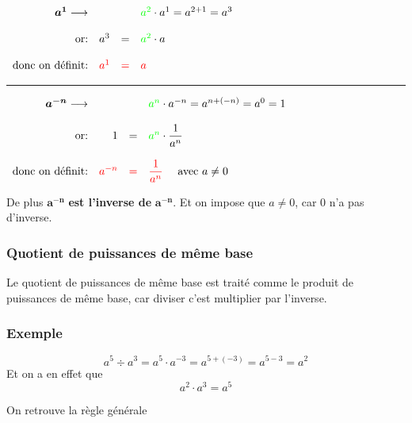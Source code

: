 \documentclass[
  12pt,
]{book}
\begin{document}
\(\begin{array}{rrcl}  \boldsymbol{a^1}\longrightarrow & & & {\color{green}a^2}\cdot a^1 = a^{2+1} = a^3\\  &&&\\  \text{or:}& a^3 & = & {\color{green}a^2}\cdot a\\  &&&\\  \text{donc on définit:}&{\color{red}a^1} & {\color{red}=} & {\color{red}a}\\  \end{array}\)

\begin{center}\rule{0.5\linewidth}{0.5pt}\end{center}

\(\begin{array}{rrcl}  \boldsymbol{a^{-n}}\longrightarrow & & & {\color{green}a^n}\cdot a^{-n} = a^{n+(-n)} = a^0 = 1\\  &&&\\  \text{or:}& 1 & = & {\color{green}a^n}\cdot \dfrac{1}{a^{n}}\\  &&&\\  \text{donc on définit:}&{\color{red}a^{-n}} & {\color{red}=} & {\color{red}\dfrac{1}{a^n}}\quad\text{ avec } a\neq 0\\  \end{array}\)

De plus \(\boldsymbol{a^{-n}}\) \textbf{est l'inverse de} \(\boldsymbol{a^{-n}}\). Et on impose que \(a\neq 0\), car \(0\) n'a pas d'inverse.

\hypertarget{quotient-de-puissances-de-muxeame-base}{%
\subsubsection{Quotient de puissances de même base}\label{quotient-de-puissances-de-muxeame-base}}

Le quotient de puissances de même base est traité comme le produit de puissances de même base, car diviser c'est multiplier par l'inverse.

\hypertarget{exemple}{%
\subsubsection{Exemple}\label{exemple}}

\[a^5\div a^3= a^5\cdot a^{-3} = a^{5+(-3)}=a^{5-3}=a^2\]
Et on a en effet que \[a^2\cdot a^3 = a^5\]

On retrouve la règle générale
\end{document}
